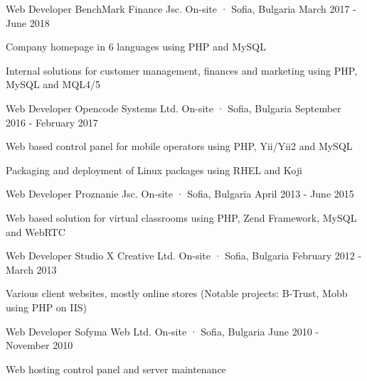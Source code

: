 \begin{cventries}
  \cventry
    {Web Developer} %
    {BenchMark Finance Jsc.} %
    {On-site · Sofia, Bulgaria} %
    {March 2017 - June 2018} %
    {
      \begin{cvitems} %
        \item {Company homepage in 6 languages using PHP and MySQL}
        \item {Internal solutions for customer management, finances and marketing using PHP, MySQL and MQL4/5}
      \end{cvitems}
    }

  \cventry
    {Web Developer} %
    {Opencode Systems Ltd.} %
    {On-site · Sofia, Bulgaria} %
    {September 2016 - February 2017} %
    {
      \begin{cvitems} %
        \item {Web based control panel for mobile operators using PHP, Yii/Yii2 and MySQL}
        \item {Packaging and deployment of Linux packages using RHEL and Koji}
      \end{cvitems}
    }

  \cventry
    {Web Developer} %
    {Proznanie Jsc.} %
    {On-site · Sofia, Bulgaria} %
    {April 2013 - June 2015} %
    {
      \begin{cvitems} %
        \item {Web based solution for virtual classrooms using PHP, Zend Framework, MySQL and WebRTC}
      \end{cvitems}
    }

  \cventry
    {Web Developer} %
    {Studio X Creative Ltd.} %
    {On-site · Sofia, Bulgaria} %
    {February 2012 - March 2013} %
    {
      \begin{cvitems} %
        \item {Various client websites, mostly online stores (Notable projects: B-Trust, Mobb using PHP on IIS)}
      \end{cvitems}
    }

  \cventry
    {Web Developer} %
    {Sofyma Web Ltd.} %
    {On-site · Sofia, Bulgaria} %
    {June 2010 - November 2010} %
    {
      \begin{cvitems} %
        \item {Web hosting control panel and server maintenance}
      \end{cvitems}
    }


\end{cventries}

